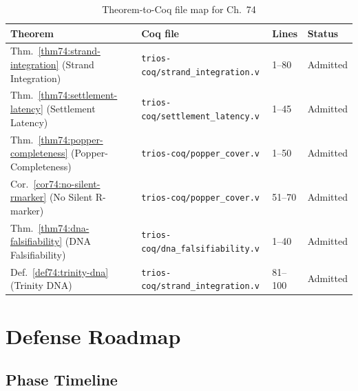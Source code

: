 \begin{table}[H]
\centering
\caption{Theorem-to-Coq file map for Ch.~74}
\label{tab74:coq-map}
\small
\begin{tabular}{llll}
\toprule
Theorem & Coq file & Lines & Status \\
\midrule
Thm.~\ref{thm74:strand-integration} (Strand Integration)
  & \texttt{trios-coq/strand\_integration.v} & 1--80  & Admitted \\
Thm.~\ref{thm74:settlement-latency} (Settlement Latency)
  & \texttt{trios-coq/settlement\_latency.v} & 1--45  & Admitted \\
Thm.~\ref{thm74:popper-completeness} (Popper-Completeness)
  & \texttt{trios-coq/popper\_cover.v}       & 1--50  & Admitted \\
Cor.~\ref{cor74:no-silent-rmarker} (No Silent R-marker)
  & \texttt{trios-coq/popper\_cover.v}       & 51--70 & Admitted \\
Thm.~\ref{thm74:dna-falsifiability} (DNA Falsifiability)
  & \texttt{trios-coq/dna\_falsifiability.v} & 1--40  & Admitted \\
Def.~\ref{def74:trinity-dna} (Trinity DNA)
  & \texttt{trios-coq/strand\_integration.v} & 81--100& Admitted \\
\bottomrule
\end{tabular}
\end{table}

\section{Defense Roadmap}
\label{sec74:defense-roadmap}

\subsection{Phase Timeline}
\label{sec74:phases}

